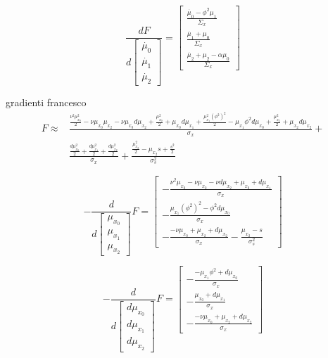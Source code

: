 \documentclass[a4paper, 10pt]{article}
\begin{document}
\begin{equation}
\frac{dF}{d \left[\begin{matrix}\dot{\mu_0}\\\dot{\mu_1}\\\dot{\mu_2}\end{matrix}\right]}  = \left[\begin{matrix}
	\frac{\dot{\mu_0}-\phi^2\mu_1}{\Sigma_x} \\
	\frac{\dot{\mu_1}+\mu_0}{\Sigma_x}\\
	\frac{\dot{\mu_2}+\mu_2-\alpha\mu_0}{\Sigma_x}\end{matrix}\right]
\end{equation}

gradienti francesco
\begin{equation}
\begin{split}
F \approx &\frac{\frac{\nu^{2} \mu_{x_0}^{2}}{2} - \nu \mu_{x_0} \mu_{x_2} - \nu \mu_{x_0} d\mu_{x_2} + \frac{\mu_{x_0}^{2}}{2} + \mu_{x_0} d\mu_{x_1} + \frac{\mu_{x_1}^{2} \left(\phi^{2}\right)^{2}}{2} - \mu_{x_1} \phi^{2} d\mu_{x_0} + \frac{\mu_{x_2}^{2}}{2} + \mu_{x_2} d\mu_{x_2}}{\sigma_{x}} + \\
& \frac{\frac{d\mu_{x_0}^{2}}{2} + \frac{d\mu_{x_1}^{2}}{2} + \frac{d\mu_{x_2}^{2}}{2}}{\sigma_{x}} + \frac{\frac{\mu_{x_2}^{2}}{2} - \mu_{x_2} s + \frac{s^{2}}{2}}{\sigma_{s}^{2}}
\end{split}
\end{equation}

\begin{equation}
- \frac{d}{d \left[\begin{matrix}\mu_{x_0}\\\mu_{x_1}\\\mu_{x_2}\end{matrix}\right]} F = \left[\begin{matrix}- \frac{\nu^{2} \mu_{x_0} - \nu \mu_{x_2} - \nu d\mu_{x_2} + \mu_{x_0} + d\mu_{x_1}}{\sigma_{x}}\\- \frac{\mu_{x_1} \left(\phi^{2}\right)^{2} - \phi^{2} d\mu_{x_0}}{\sigma_{x}}\\- \frac{- \nu \mu_{x_0} + \mu_{x_2} + d\mu_{x_2}}{\sigma_{x}} - \frac{\mu_{x_2} - s}{\sigma_{s}^{2}}\end{matrix}\right]
\end{equation}

\begin{equation}
- \frac{d}{d \left[\begin{matrix}d\mu_{x_0}\\d\mu_{x_1}\\d\mu_{x_2}\end{matrix}\right]} F = \left[\begin{matrix}- \frac{- \mu_{x_1} \phi^{2} + d\mu_{x_0}}{\sigma_{x}}\\- \frac{\mu_{x_0} + d\mu_{x_1}}{\sigma_{x}}\\- \frac{- \nu \mu_{x_0} + \mu_{x_2} + d\mu_{x_2}}{\sigma_{x}}\end{matrix}\right]
\end{equation}
\end{document}
